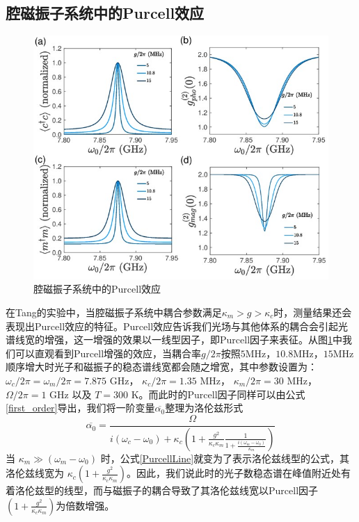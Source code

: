 \subsection{腔磁振子系统中的Purcell效应}
\begin{figure}[htbp]
	\centering
	\includegraphics[width=1.9\basefigurewidth,clip]{./figure/4_8}
	\caption{腔磁振子系统中的Purcell效应} 
	\label{PurcellgVary}
\end{figure}
在Tang的实验中，当腔磁振子系统中耦合参数满足$\kappa_m>g>\kappa_c$时，测量结果还会表现出Purcell效应的特征。Purcell效应告诉我们光场与其他体系的耦合会引起光谱线宽的增强，这一增强的效果以一线型因子，即Purcell因子来表征。从图\ref{PurcellgVary}中我们可以直观看到Purcell增强的效应，当耦合率$g/2\pi$按照$5$MHz，$10.8$MHz，$15$MHz顺序增大时光子和磁振子的稳态谱线宽都会随之增宽，其中参数设置为：$\omega_c/2\pi=\omega_m/2\pi=7.875$ GHz， $\kappa_c/2\pi=1.35$ MHz， $\kappa_m/2\pi=30$ MHz， $\Omega/2\pi=1$ GHz 以及 $T=300$ K。而此时的Purcell因子同样可以由公式\eqref{first_order}导出，我们将一阶变量$\overline{\alpha_{0}}$整理为洛伦兹形式
\begin{equation}
\overline{\alpha_{0}}=\frac{\Omega}{i(\omega_{c}-\omega_{0})+\kappa_{c}\left(1+\frac{g^{2}}{\kappa_{c}\kappa_{m}}\frac{1}{1+\frac{i(\omega_{m}-\omega_{0})}{\kappa_{m}}}\right)}
\label{PurcellLine}
\end{equation}
当 $\kappa_m\gg(\omega_{m}-\omega_{0})$ 时，公式\eqref{PurcellLine}就变为了表示洛伦兹线型的公式，其洛伦兹线宽为 $\kappa_c(1+\frac{g^{2}}{\kappa_{c}\kappa_{m}})$。因此，我们说此时的光子数稳态谱在峰值附近处有着洛伦兹型的线型，而与磁振子的耦合导致了其洛伦兹线宽以Purcell因子$(1+\frac{g^{2}}{\kappa_{c}\kappa_{m}})$为倍数增强。

